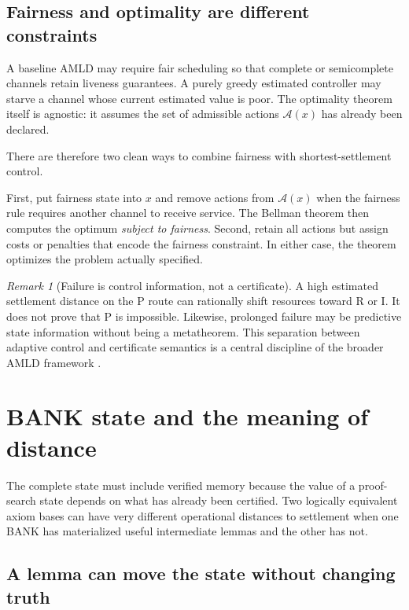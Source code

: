 \documentclass[11pt,letterpaper]{article}
\theoremstyle{remark}
\newtheorem{remark}[theorem]{Remark}
\newcommand{\A}{\mathcal A}
\begin{document}
\subsection{Fairness and optimality are different constraints}

A baseline AMLD may require fair scheduling so that complete or semicomplete channels retain liveness guarantees. A purely greedy estimated controller may starve a channel whose current estimated value is poor. The optimality theorem itself is agnostic: it assumes the set of admissible actions $\A(x)$ has already been declared.

There are therefore two clean ways to combine fairness with shortest-settlement control.

First, put fairness state into $x$ and remove actions from $\A(x)$ when the fairness rule requires another channel to receive service. The Bellman theorem then computes the optimum \emph{subject to fairness}. Second, retain all actions but assign costs or penalties that encode the fairness constraint. In either case, the theorem optimizes the problem actually specified.

\begin{remark}[Failure is control information, not a certificate]
A high estimated settlement distance on the P route can rationally shift resources toward R or I. It does not prove that P is impossible. Likewise, prolonged failure may be predictive state information without being a metatheorem. This separation between adaptive control and certificate semantics is a central discipline of the broader AMLD framework \cite{AMLD2,VSS}.
\end{remark}

\section{BANK state and the meaning of distance}\label{sec:bank}

The complete state must include verified memory because the value of a proof-search state depends on what has already been certified. Two logically equivalent axiom bases can have very different operational distances to settlement when one BANK has materialized useful intermediate lemmas and the other has not.

\subsection{A lemma can move the state without changing truth}
\end{document}
